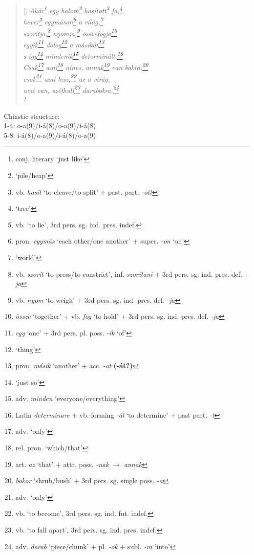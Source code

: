 \documentclass[a4paper,12pt,twoside,final]{book}
\begin{document}
\begin{verse}[\versewidth]
  \it
  Akár\footnote{conj. literary `just like'} egy
  halom\footnote{`pile/heap'} hasított\footnote{vb.
  \emph{hasít} `to cleave/to split' +
  past. part. \emph{-ott} } fa,\footnote{`tree'} \\
  hever\footnote{vb. `to lie', 3rd pers. sg. ind. pres. indef.}
  egymáson\footnote{pron. \emph{egymás} `each other/one
  another' + super. \emph{-on} `on'} a világ,\footnote{`world'} \\
  szorítja,\footnote{vb. \emph{szorít} `to press/to
  constrict', inf. \emph{szorítani} + 3rd
  pers. sg. ind. pres. def. \emph{-ja}} nyomja,\footnote{vb.
  \emph{nyom} `to weigh' + 3rd pers. sg. ind. pres. def. \emph{-ja}}
  összefogja\footnote{\emph{össze} `together' + vb. \emph{fog}
  `to hold' + 3rd pers. sg. ind. pres. def. \emph{-ja}} \\
  egyik\footnote{\emph{egy} `one' + 3rd
  pers. pl. poss. \emph{-ik} `of' } dolog\footnote{`thing'} a
  másikát\footnote{pron. \emph{másik} `another' +
  acc. \emph{-at} \textbf{(-át?)}} \\
  s így\footnote{`just so'} mindenik\footnote{adv. \emph{minden}
  `everyone/everything'} determinált.\footnote{Latin \emph{determinare} +
  vb.-forming \emph{-ál} `to determine' + past part. \emph{-t}} \\
  Csak\footnote{adv. `only'} ami\footnote{rel. pron. `which/that'} nincs,
  annak\footnote{art. \emph{az} `that' + attr. poss. \emph{-nak}
  $\rightarrow$ \emph{annak}}
  van bokra,\footnote{\emph{bokor} `shrub/bush' + 3rd
  pers. sg. single poss. \emph{-a}} \\
  csak\footnote{adv. `only'} ami lesz,\footnote{vb. `to
  become', 3rd pers. sg. ind. fut. indef.} az a virág, \\
  ami van, széthull\footnote{vb. `to fall apart',
  3rd pers. sg. ind. pres. indef.}
  darabokra.\footnote{adv. \emph{darab} `piece/chunk' +
  pl. \emph{-ok} + subl. \emph{-ra} `into'} \\!
\end{verse}

\noindent Chiastic structure: \\
1-4: o-a(9)/i-á(8)/o-a(9)/i-á(8) \\
5-8: i-á(8)/o-a(9)/i-á(8)/o-a(9)

\newpage


\settowidth{\versewidth}{stubbornly leaping at the bright, dewy coal.}
\end{document}
